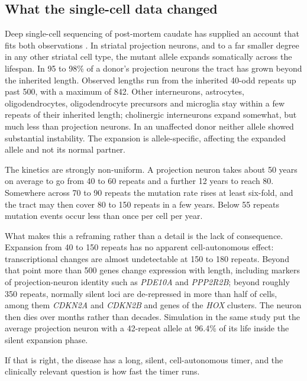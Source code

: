 \documentclass[conference]{IEEEtran}
\begin{document}
\subsection{What the single-cell data changed}
\label{sec:1.2}
Deep single-cell sequencing of post-mortem caudate has supplied an account that fits both observations \cite{handsaker}. In striatal projection neurons, and to a far smaller degree in any other striatal cell type, the mutant allele expands somatically across the lifespan. In 95 to 98\% of a donor's projection neurons the tract has grown beyond the inherited length. Observed lengths run from the inherited 40-odd repeats up past 500, with a maximum of 842. Other interneurons, astrocytes, oligodendrocytes, oligodendrocyte precursors and microglia stay within a few repeats of their inherited length; cholinergic interneurons expand somewhat, but much less than projection neurons. In an unaffected donor neither allele showed substantial instability. The expansion is allele-specific, affecting the expanded allele and not its normal partner.

The kinetics are strongly non-uniform. A projection neuron takes about 50 years on average to go from 40 to 60 repeats and a further 12 years to reach 80. Somewhere across 70 to 90 repeats the mutation rate rises at least six-fold, and the tract may then cover 80 to 150 repeats in a few years. Below 55 repeats mutation events occur less than once per cell per year.

What makes this a reframing rather than a detail is the lack of consequence. Expansion from 40 to 150 repeats has no apparent cell-autonomous effect: transcriptional changes are almost undetectable at 150 to 180 repeats. Beyond that point more than 500 genes change expression with length, including markers of projection-neuron identity such as \textit{PDE10A} and \textit{PPP2R2B}; beyond roughly 350 repeats, normally silent loci are de-repressed in more than half of cells, among them \textit{CDKN2A} and \textit{CDKN2B} and genes of the \textit{HOX} clusters. The neuron then dies over months rather than decades. Simulation in the same study put the average projection neuron with a 42-repeat allele at 96.4\% of its life inside the silent expansion phase.

If that is right, the disease has a long, silent, cell-autonomous timer, and the clinically relevant question is how fast the timer runs.
\end{document}
